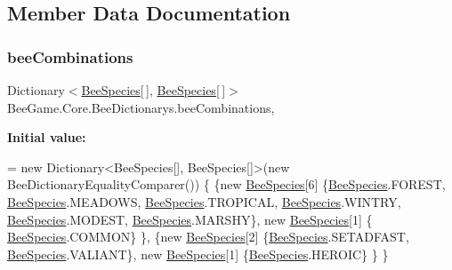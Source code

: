 \subsection{Member Data Documentation}
\mbox{\label{class_bee_game_1_1_core_1_1_bee_dictionarys_a1ebc1dfba158d134ff8b28082c9a2cb2}} 
\subsubsection{\texorpdfstring{bee\+Combinations}{beeCombinations}}
{\footnotesize\ttfamily Dictionary$<$\hyperlink{namespace_bee_game_1_1_enums_aa2ead984825678d83c42d48f6382619c}{Bee\+Species}\mbox{[}$\,$\mbox{]}, \hyperlink{namespace_bee_game_1_1_enums_aa2ead984825678d83c42d48f6382619c}{Bee\+Species}\mbox{[}$\,$\mbox{]}$>$ Bee\+Game.\+Core.\+Bee\+Dictionarys.\+bee\+Combinations\hspace{0.3cm}{\ttfamily [static]}, {\ttfamily [private]}}

{\bfseries Initial value\+:}
\begin{DoxyCode}
= \textcolor{keyword}{new} Dictionary<BeeSpecies[], BeeSpecies[]>(\textcolor{keyword}{new} BeeDictionaryEqualityComparer())
        \{
            \{\textcolor{keyword}{new} \hyperlink{namespace_bee_game_1_1_enums_aa2ead984825678d83c42d48f6382619c}{BeeSpecies}[6] \{\hyperlink{namespace_bee_game_1_1_enums_aa2ead984825678d83c42d48f6382619c}{BeeSpecies}.FOREST, 
      \hyperlink{namespace_bee_game_1_1_enums_aa2ead984825678d83c42d48f6382619c}{BeeSpecies}.MEADOWS, \hyperlink{namespace_bee_game_1_1_enums_aa2ead984825678d83c42d48f6382619c}{BeeSpecies}.TROPICAL, \hyperlink{namespace_bee_game_1_1_enums_aa2ead984825678d83c42d48f6382619c}{BeeSpecies}.WINTRY, 
      \hyperlink{namespace_bee_game_1_1_enums_aa2ead984825678d83c42d48f6382619c}{BeeSpecies}.MODEST, \hyperlink{namespace_bee_game_1_1_enums_aa2ead984825678d83c42d48f6382619c}{BeeSpecies}.MARSHY\}, \textcolor{keyword}{new} \hyperlink{namespace_bee_game_1_1_enums_aa2ead984825678d83c42d48f6382619c}{BeeSpecies}[1] \{
      \hyperlink{namespace_bee_game_1_1_enums_aa2ead984825678d83c42d48f6382619c}{BeeSpecies}.COMMON\} \},
            \{\textcolor{keyword}{new} \hyperlink{namespace_bee_game_1_1_enums_aa2ead984825678d83c42d48f6382619c}{BeeSpecies}[2] \{\hyperlink{namespace_bee_game_1_1_enums_aa2ead984825678d83c42d48f6382619c}{BeeSpecies}.SETADFAST, 
      \hyperlink{namespace_bee_game_1_1_enums_aa2ead984825678d83c42d48f6382619c}{BeeSpecies}.VALIANT\}, \textcolor{keyword}{new} \hyperlink{namespace_bee_game_1_1_enums_aa2ead984825678d83c42d48f6382619c}{BeeSpecies}[1] \{\hyperlink{namespace_bee_game_1_1_enums_aa2ead984825678d83c42d48f6382619c}{BeeSpecies}.HEROIC\} \}
        \}
\end{DoxyCode}


